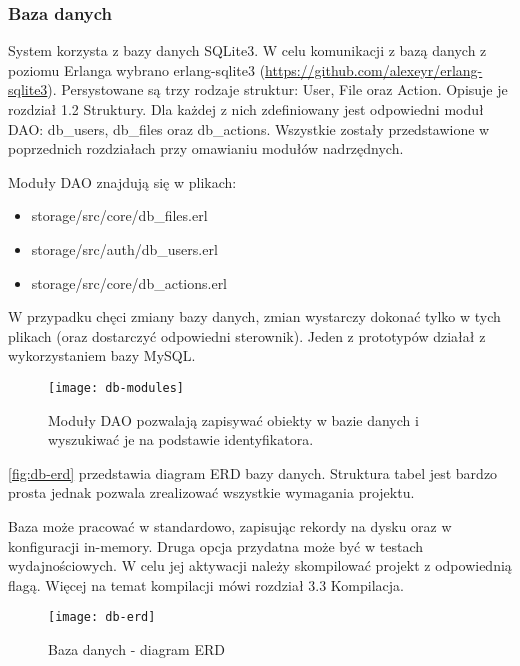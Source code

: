 \subsubsection{Baza danych}
System korzysta z bazy danych SQLite3. W celu komunikacji z bazą danych z poziomu Erlanga wybrano erlang-sqlite3 (\url{https://github.com/alexeyr/erlang-sqlite3}). Persystowane są trzy rodzaje struktur: User, File oraz Action. Opisuje je rozdział 1.2 Struktury. Dla każdej z nich zdefiniowany jest odpowiedni moduł DAO: db\_users, db\_files oraz db\_actions. Wszystkie zostały przedstawione w poprzednich rozdziałach przy omawianiu modułów nadrzędnych.

Moduły DAO znajdują się w plikach:
\begin{itemize}
	\item storage/src/core/db\_files.erl
	\item storage/src/auth/db\_users.erl
	\item storage/src/core/db\_actions.erl
\end{itemize}

W przypadku chęci zmiany bazy danych, zmian wystarczy dokonać tylko w tych plikach (oraz dostarczyć odpowiedni sterownik). Jeden z prototypów działał z wykorzystaniem bazy MySQL.

\begin{figure}[!htbp]
	\centering
	\texttt{[image: db-modules]}
	\caption[Struktura modułów DAO.]{Moduły DAO pozwalają zapisywać obiekty w bazie danych i wyszukiwać je na podstawie identyfikatora.}
	\label{fig:db-modules}
\end{figure}

\autoref{fig:db-erd} przedstawia diagram ERD bazy danych. Struktura tabel jest bardzo prosta jednak pozwala zrealizować wszystkie wymagania projektu.

Baza może pracować w standardowo, zapisując rekordy na dysku oraz w konfiguracji in-memory. Druga opcja przydatna może być w testach wydajnościowych. W celu jej aktywacji należy skompilować projekt z odpowiednią flagą. Więcej na temat kompilacji mówi rozdział 3.3 Kompilacja.

\begin{figure}[!htbp]
	\centering
	\texttt{[image: db-erd]}
	\caption{Baza danych - diagram ERD}
	\label{fig:db-erd}
\end{figure}